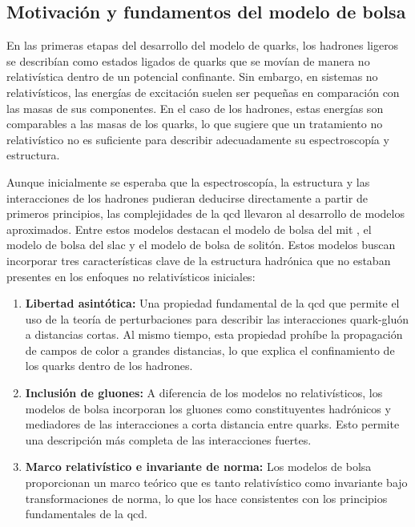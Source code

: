 \subsection{Motivación y fundamentos del modelo de bolsa}

En las primeras etapas del desarrollo del modelo de quarks, los hadrones ligeros se describían como estados ligados de quarks que se movían de manera no relativística dentro de un potencial confinante. Sin embargo, en sistemas no relativísticos, las energías de excitación suelen ser pequeñas en comparación con las masas de sus componentes. En el caso de los hadrones, estas energías son comparables a las masas de los quarks, lo que sugiere que un tratamiento no relativístico no es suficiente para describir adecuadamente su espectroscopía y estructura. %

Aunque inicialmente se esperaba que la espectroscopía, la estructura y las interacciones de los hadrones pudieran deducirse directamente a partir de primeros principios, las complejidades de la \gls{qcd} llevaron al desarrollo de modelos aproximados. Entre estos modelos destacan el modelo de bolsa del \gls{mit} %
, el modelo de bolsa del \gls{slac} y el modelo de bolsa de solitón. Estos modelos buscan incorporar tres características clave de la estructura hadrónica que no estaban presentes en los enfoques no relativísticos iniciales:

\renewcommand{\labelenumi}{\alph{enumi})}

\begin{enumerate}
\item \textbf{Libertad asintótica:} Una propiedad fundamental de la \gls{qcd} que permite el uso de la teoría de perturbaciones para describir las interacciones quark-gluón a distancias cortas. Al mismo tiempo, esta propiedad prohíbe la propagación de campos de color a grandes distancias, lo que explica el confinamiento de los quarks dentro de los hadrones. %
\item \textbf{Inclusión de gluones:}  A diferencia de los modelos no relativísticos, los modelos de bolsa incorporan los gluones como constituyentes hadrónicos y mediadores de las interacciones a corta distancia entre quarks. Esto permite una descripción más completa de las interacciones fuertes. %
\item \textbf{Marco relativístico e invariante de norma:} Los modelos de bolsa proporcionan un marco teórico que es tanto relativístico como invariante bajo transformaciones de norma, lo que los hace consistentes con los principios fundamentales de la \gls{qcd}. %

\end{enumerate}


